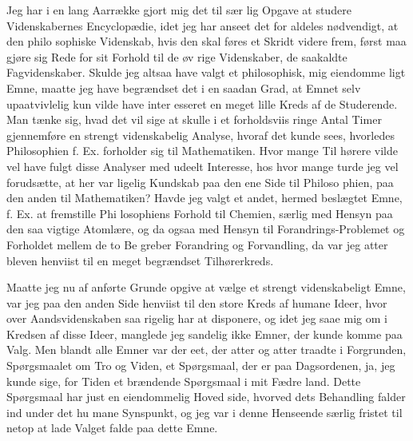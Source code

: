 \documentclass[12pt]{book}
\newcommand{\opage}[1]{\marginnote{\footnotesize\textit{[#1]}}}
\begin{document}
Jeg har i en lang Aarrække gjort mig det til sær\-%
lig Opgave at studere Videnskabernes Encyclopædie, idet
jeg har anseet det for aldeles nødvendigt, at den philo\-%
sophiske Videnskab, hvis den skal føres et Skridt videre
frem, først maa gjøre sig Rede for sit Forhold til de øv\-%
rige Videnskaber, de saakaldte Fagvidenskaber. Skulde
jeg altsaa have valgt et philosophisk, mig eiendomme\-%
ligt Emne, maatte jeg have begrændset det i en saadan
Grad, at Emnet selv upaatvivlelig kun vilde have inter\-%
\opage{281}\setcounter{footnote}{0}%
esseret en meget lille Kreds af de Studerende. Man
tænke sig, hvad det vil sige at skulle i et forholdsviis
ringe Antal Timer gjennemføre en strengt videnskabelig
Analyse, hvoraf det kunde sees, hvorledes Philosophien
f. Ex. forholder sig til Mathematiken. Hvor mange Til\-%
hørere vilde vel have fulgt disse Analyser med udeelt
Interesse, hos hvor mange turde jeg vel forudsætte, at
her var ligelig Kundskab paa den ene Side til Philoso\-%
phien, paa den anden til Mathematiken? Havde jeg valgt
et andet, hermed beslægtet Emne, f. Ex. at fremstille Phi\-%
losophiens Forhold til Chemien, særlig med Hensyn paa
den saa vigtige Atomlære, og da ogsaa med Hensyn til
Forandrings-Problemet og Forholdet mellem de to Be\-%
greber Forandring og Forvandling, da var jeg atter bleven
henviist til en meget begrændset Tilhørerkreds.

Maatte jeg nu af anførte Grunde opgive at vælge et
strengt videnskabeligt Emne, var jeg paa den anden
Side henviist til den store Kreds af humane Ideer, hvor\-%
over Aandsvidenskaben saa rigelig har at disponere, og
idet jeg saae mig om i Kredsen af disse Ideer, manglede
jeg sandelig ikke Emner, der kunde komme paa Valg.
Men blandt alle Emner var der eet, der atter og atter
traadte i Forgrunden, Spørgsmaalet om Tro og Viden,
et Spørgsmaal, der er paa Dagsordenen, ja, jeg kunde
sige, for Tiden et brændende Spørgsmaal i mit Fædre\-%
land. Dette Spørgsmaal har just en eiendommelig Hoved\-%
side, hvorved dets Behandling falder ind under det hu\-%
mane Synspunkt, og jeg var i denne Henseende særlig
fristet til netop at lade Valget falde paa dette Emne.
\end{document}
